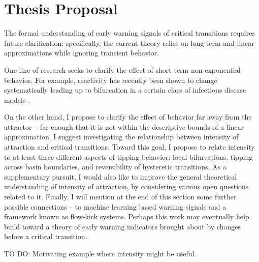\section{Thesis Proposal}
\label{sec:proposal}

The formal understanding of early warning signals of critical transitions requires future clarification; specifically, the current theory relies on long-term and linear approximations while ignoring transient behavior. 

One line of research seeks to clarify the effect of short term non-exponential behavior. For example, reactivity has recently been shown to change systematically leading up to bifurcation in a certain class of infectious disease models \cite{oreganTransientIndicatorsTipping2020}. 

On the other hand, I propose to clarify the effect of behavior far away from the attractor -- far enough that it is not within the descriptive bounds of a linear approximation. I suggest investigating the relationship between intensity of attraction and critical transitions. 
%
Toward this goal, I propose to relate intensity to at least three different aspects of tipping behavior: local bifurcations, tipping across basin boundaries, and reversibility of hysteretic transitions. As a supplementary pursuit, I would also like to improve the general theoretical understanding of intensity of attraction, by considering various open questions related to it. Finally, I will mention at the end of this section some further possible connections -- to machine learning based warning signals and a framework known as  flow-kick systems. 
%
Perhaps this work may eventually help build toward a theory of early warning indicators brought about by changes before a critical transition. 


%

TO DO: Motivating example where intensity might be useful.


